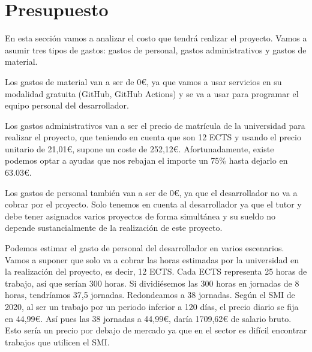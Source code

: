 \documentclass[12pt]{report} %
\begin{document}
\section{Presupuesto}

En esta sección vamos a analizar el costo que tendrá realizar el proyecto. Vamos a asumir tres tipos de gastos: gastos de personal, gastos administrativos y gastos de material.

Los gastos de material van a ser de 0€, ya que vamos a usar servicios en su modalidad gratuita (GitHub, GitHub Actions) y se va a usar para programar el equipo personal del desarrollador.

Los gastos administrativos van a ser el precio de matrícula de la universidad para realizar el proyecto, que teniendo en cuenta que son 12 ECTS y usando el precio unitario de 21,01€, supone un coste de 252,12€. Afortunadamente, existe podemos optar a ayudas que nos rebajan el importe un 75\% hasta dejarlo en 63.03€.

Los gastos de personal también van a ser de 0€, ya que el desarrollador no va a cobrar por el proyecto. Solo tenemos en cuenta al desarrollador ya que el tutor y debe tener asignados varios proyectos de forma simultánea y su sueldo no depende sustancialmente de la realización de este proyecto. 

Podemos estimar el gasto de personal del desarrollador en varios escenarios. Vamos a suponer que solo va a cobrar las horas estimadas por la universidad en la realización del proyecto, es decir, 12 ECTS. Cada ECTS representa 25 horas de trabajo, así que serían 300 horas. Si dividiésemos las 300 horas en jornadas de 8 horas, tendríamos 37,5 jornadas. Redondeamos a 38 jornadas. Según el SMI de 2020, al ser un trabajo por un periodo inferior a 120 días, el precio diario se fija en 44,99€. Así pues las 38 jornadas a 44,99€, daría 1709,62€ de salario bruto.\cite{smi} Esto sería un precio por debajo de mercado ya que en el sector es difícil encontrar trabajos que utilicen el SMI.

 


\end{document}
